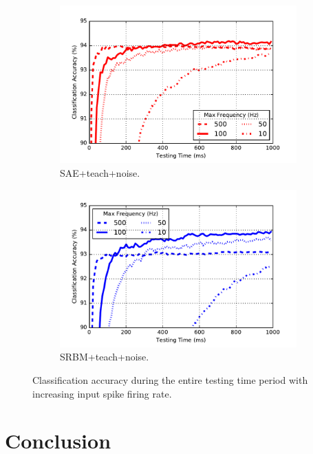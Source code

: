 \begin{figure}
	\centering
	\begin{subfigure}[t]{0.45\textwidth}
		\includegraphics[width=\textwidth]{pics_sdlm/43_MNIST_SAE_all/result_freq.pdf}
		\caption{SAE+teach+noise.}
	\end{subfigure}
	\begin{subfigure}[t]{0.45\textwidth}
		\includegraphics[width=\textwidth]{pics_sdlm/51_MNIST_SRBM_teach/result_freq.pdf}
		\caption{SRBM+teach+noise.}
	\end{subfigure}
	\caption{Classification accuracy during the entire testing time period with increasing input spike firing rate.}
\end{figure}

\section{Conclusion}
